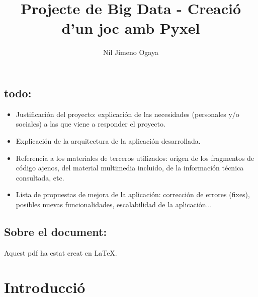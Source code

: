 

\title{Projecte de Big Data - Creaci\'o d'un joc amb Pyxel}
\author{Nil Jimeno Ogaya}



\maketitle

\subsection*{todo:}
\begin{itemize}
	\item{Justificación del proyecto: explicación de las necesidades (personales y/o
		sociales) a las que viene a responder el proyecto.}
	\item{Explicación de la arquitectura de la aplicación desarrollada.}
	\item{Referencia a los materiales de terceros utilizados: origen de los fragmentos de
		código ajenos, del material multimedia incluido, de la información técnica
		consultada, etc.}
	\item{Lista de propuestas de mejora de la aplicación: corrección de errores (fixes),
		posibles nuevas funcionalidades, escalabilidad de la aplicación...}
\end{itemize}

\subsection*{Sobre el document:}

Aquest pdf ha estat creat en \LaTeX.

\section{Introducci\'o}






